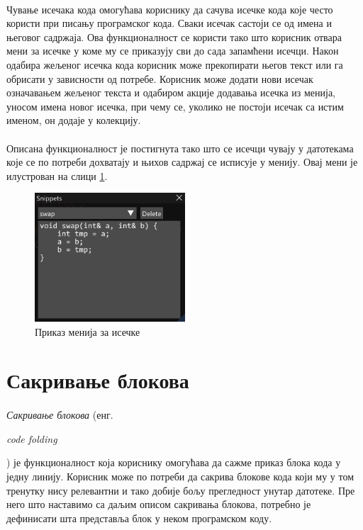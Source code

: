 \documentclass[12pt,oneside]{memoir}
\begin{document}
\paragraph{}
Чување исечака кода омогућава кориснику да сачува
исечке кода које често користи при писању програмског кода. Сваки исечак састоји се од имена и његовог садржаја. Ова функционалност се користи тако
што корисник отвара мени за исечке у коме му се приказују сви до сада
запамћени исечци. Након одабира жељеног исечка кода корисник може прекопирати његов текст или га обрисати у зависности од потребе. Корисник може додати нови исечак означавањем жељеног текста и одабиром акције додавања исечка из менија, 
уносом имена новог исечка, при чему се, уколико не постоји исечак
са истим именом, он додаје у колекцију. 

\paragraph{}
Описана функционалност је постигнута тако што се исечци чувају у датотекама које се по потреби дохватају и њихов садржај се исписује у менију. Овај мени
је илустрован на слици \ref{fig:code_snippets}.

\begin{figure}[!ht]
	\centering
	\includegraphics[width=0.5\textwidth]{images/code_snippets.png}
	\caption{Приказ менија за исечке}
	\label{fig:code_snippets}
\end{figure} 

\section{Сакривање блокова}
\paragraph{}
\emph{Сакривање блокова} (енг. \begin{latinica}\textit{code folding}\end{latinica}) је функционалност која кориснику омогућава да сажме 
приказ блока кода у једну линију. Корисник може по потреби да сакрива блокове
кода који му у том тренутку нису релевантни и тако добије бољу прегледност
унутар датотеке. Пре него што наставимо са даљим описом сакривања блокова,
потребно је дефинисати шта представља блок у неком програмском коду.
\end{document}
